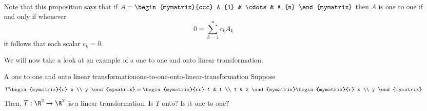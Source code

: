 Note that this proposition says that if $A=\begin{mymatrix}{ccc}
A_{1} & \cdots & A_{n}
\end{mymatrix} $ then $A$ is one to one if and only if whenever
\begin{equation*}
0 = \sum_{k=1}^{n}c_{k}A_{k}
\end{equation*}
it follows that each scalar $c_{k}=0$. 

We will now take a look at an example of a one to one and onto linear transformation. 

\begin{example}{A one to one and onto linear transformation}{one-to-one-onto-linear-transformation}
Suppose
\begin{equation*}
T\begin{mymatrix}{c}
x \\
y
\end{mymatrix} =\begin{mymatrix}{rr}
1 & 1 \\
1 & 2
\end{mymatrix} \begin{mymatrix}{r}
x \\
y
\end{mymatrix}
\end{equation*}
Then, $T:\R^{2}\rightarrow \R^{2}$ is a linear
transformation. Is $T$ onto? Is it one to one?
\end{example}

